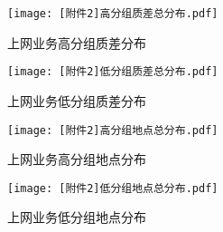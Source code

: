 \documentclass{MathorCupmodeling}
\begin{document}
	\begin{figure}[H]
		\centering
		\begin{minipage}{0.48\linewidth}
			\centering
			\texttt{[image: [附件2]高分组质差总分布.pdf]}
			\caption{上网业务高分组质差分布}
			\label{fig:上网业务高分组质差分布}
		\end{minipage}
		\begin{minipage}{0.48\linewidth}
			\centering
			\texttt{[image: [附件2]低分组质差总分布.pdf]}
			\caption{上网业务低分组质差分布}
			\label{fig:上网业务低分组质差分布}
		\end{minipage}
	\end{figure}
	\begin{figure}[H]
		\centering
		\begin{minipage}{0.48\linewidth}
			\centering
			\texttt{[image: [附件2]高分组地点总分布.pdf]}
			\caption{上网业务高分组地点分布}
			\label{fig:上网业务高分组地点分布}
		\end{minipage}
		\begin{minipage}{0.48\linewidth}
			\centering
			\texttt{[image: [附件2]低分组地点总分布.pdf]}
			\caption{上网业务低分组地点分布}
			\label{fig:上网业务低分组地点分布}
		\end{minipage}
	\end{figure}

\newpage
	~\\
\end{document}
